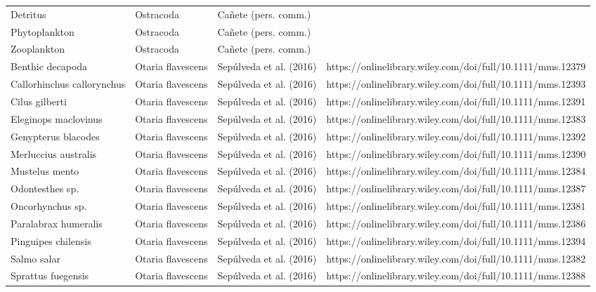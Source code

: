 \documentclass[
]{article}
\begin{document}
\begin{landscape}
\begin{longtable}[t]{>{\raggedright\arraybackslash}p{4cm}>{\centering\arraybackslash}p{4cm}>{\centering\arraybackslash}p{6cm}>{\centering\arraybackslash}p{6cm}}
Detritus & Ostracoda & \tiny Cañete (pers. comm.) & \tiny\\
Phytoplankton & Ostracoda & \tiny Cañete (pers. comm.) & \tiny\\
Zooplankton & Ostracoda & \tiny Cañete (pers. comm.) & \tiny\\
\addlinespace
Benthic decapoda & Otaria flavescens & \tiny Sepúlveda et al. (2016) & \tiny https://onlinelibrary.wiley.com/doi/full/10.1111/mms.12379\\
Callorhinchus callorynchus & Otaria flavescens & \tiny Sepúlveda et al. (2016) & \tiny https://onlinelibrary.wiley.com/doi/full/10.1111/mms.12393\\
Cilus gilberti & Otaria flavescens & \tiny Sepúlveda et al. (2016) & \tiny https://onlinelibrary.wiley.com/doi/full/10.1111/mms.12391\\
Eleginops maclovinus & Otaria flavescens & \tiny Sepúlveda et al. (2016) & \tiny https://onlinelibrary.wiley.com/doi/full/10.1111/mms.12383\\
Genypterus blacodes & Otaria flavescens & \tiny Sepúlveda et al. (2016) & \tiny https://onlinelibrary.wiley.com/doi/full/10.1111/mms.12392\\
\addlinespace
Merluccius australis & Otaria flavescens & \tiny Sepúlveda et al. (2016) & \tiny https://onlinelibrary.wiley.com/doi/full/10.1111/mms.12390\\
Mustelus mento & Otaria flavescens & \tiny Sepúlveda et al. (2016) & \tiny https://onlinelibrary.wiley.com/doi/full/10.1111/mms.12384\\
Odontesthes sp. & Otaria flavescens & \tiny Sepúlveda et al. (2016) & \tiny https://onlinelibrary.wiley.com/doi/full/10.1111/mms.12387\\
Oncorhynchus sp. & Otaria flavescens & \tiny Sepúlveda et al. (2016) & \tiny https://onlinelibrary.wiley.com/doi/full/10.1111/mms.12381\\
Paralabrax humeralis & Otaria flavescens & \tiny Sepúlveda et al. (2016) & \tiny https://onlinelibrary.wiley.com/doi/full/10.1111/mms.12386\\
\addlinespace
Pinguipes chilensis & Otaria flavescens & \tiny Sepúlveda et al. (2016) & \tiny https://onlinelibrary.wiley.com/doi/full/10.1111/mms.12394\\
Salmo salar & Otaria flavescens & \tiny Sepúlveda et al. (2016) & \tiny https://onlinelibrary.wiley.com/doi/full/10.1111/mms.12382\\
Sprattus fuegensis & Otaria flavescens & \tiny Sepúlveda et al. (2016) & \tiny https://onlinelibrary.wiley.com/doi/full/10.1111/mms.12388\\

\end{longtable}
\end{landscape}
\end{document}

